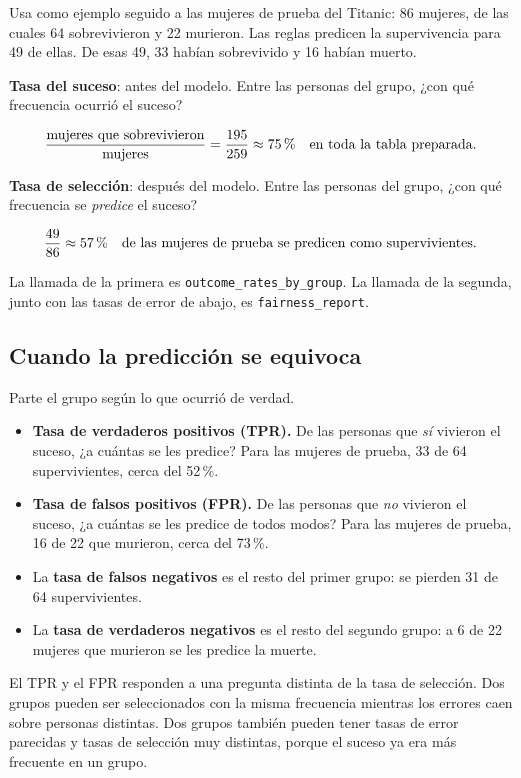 \documentclass[11pt]{article}
\newcommand{\fn}[1]{\texttt{\small #1}}
\newcommand{\pct}[1]{\mbox{#1\,\%}}
\begin{document}
Usa como ejemplo seguido a las mujeres de prueba del Titanic: 86 mujeres, de las cuales 64 sobrevivieron y 22 murieron. Las reglas predicen la supervivencia para 49 de ellas. De esas 49, 33 habían sobrevivido y 16 habían muerto.

\begin{idea}
\textbf{Tasa del suceso}: antes del modelo. Entre las personas del grupo, ¿con qué frecuencia ocurrió el suceso?

\[
\frac{\text{mujeres que sobrevivieron}}{\text{mujeres}} = \frac{195}{259} \approx \pct{75}
\quad\text{en toda la tabla preparada.}
\]

\textbf{Tasa de selección}: después del modelo. Entre las personas del grupo, ¿con qué frecuencia se \emph{predice} el suceso?

\[
\frac{49}{86} \approx \pct{57}
\quad\text{de las mujeres de prueba se predicen como supervivientes.}
\]

La llamada de la primera es \fn{outcome\_rates\_by\_group}. La llamada de la segunda, junto con las tasas de error de abajo, es \fn{fairness\_report}.
\end{idea}

\subsection{Cuando la predicción se equivoca}

Parte el grupo según lo que ocurrió de verdad.

\begin{itemize}
  \item \textbf{Tasa de verdaderos positivos (TPR).} De las personas que \emph{sí} vivieron el suceso, ¿a cuántas se les predice? Para las mujeres de prueba, 33 de 64 supervivientes, cerca del \pct{52}.
  \item \textbf{Tasa de falsos positivos (FPR).} De las personas que \emph{no} vivieron el suceso, ¿a cuántas se les predice de todos modos? Para las mujeres de prueba, 16 de 22 que murieron, cerca del \pct{73}.
  \item La \textbf{tasa de falsos negativos} es el resto del primer grupo: se pierden 31 de 64 supervivientes.
  \item La \textbf{tasa de verdaderos negativos} es el resto del segundo grupo: a 6 de 22 mujeres que murieron se les predice la muerte.
\end{itemize}

El TPR y el FPR responden a una pregunta distinta de la tasa de selección. Dos grupos pueden ser seleccionados con la misma frecuencia mientras los errores caen sobre personas distintas. Dos grupos también pueden tener tasas de error parecidas y tasas de selección muy distintas, porque el suceso ya era más frecuente en un grupo.
\end{document}
